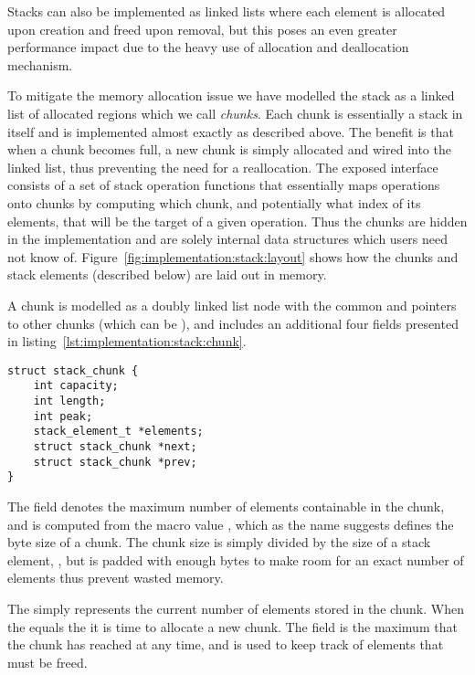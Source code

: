 \begin{remark}
  Stacks can also be implemented as linked lists where each element is
  allocated upon creation and freed upon removal, but this poses an
  even greater performance impact due to the heavy use of allocation
  and deallocation mechanism.
\end{remark}

To mitigate the memory allocation issue we have modelled the stack as
a linked list of allocated regions which we call \textit{chunks}. Each
chunk is essentially a stack in itself and is implemented almost
exactly as described above. The benefit is that when a chunk becomes
full, a new chunk is simply allocated and wired into the linked list,
thus preventing the need for a reallocation. The exposed interface
consists of a set of stack operation functions that essentially maps
operations onto chunks by computing which chunk, and potentially what
index of its elements, that will be the target of a given
operation. Thus the chunks are hidden in the implementation and are
solely internal data structures which users need not know
of. Figure~\ref{fig:implementation:stack:layout} shows how the chunks
and stack elements (described below) are laid out in memory.

A chunk is modelled as a doubly linked list node with the common
 and  pointers to other chunks (which can be
), and includes an additional four fields presented in
listing~\ref{lst:implementation:stack:chunk}.

\begin{lstlisting}[language={[ANSI]C},%
  caption={Structure defining a chunk of the stack},%
  label={lst:implementation:stack:chunk}]
struct stack_chunk {
    int capacity;
    int length;
    int peak;
    stack_element_t *elements;
    struct stack_chunk *next;
    struct stack_chunk *prev;
}
\end{lstlisting}

The  field denotes the maximum number of elements
containable in the chunk, and is computed from the macro value
, which as the name suggests defines the byte
size of a chunk. The chunk size is simply divided by the size of a
stack element, , but is padded with enough
bytes to make room for an exact number of elements thus prevent wasted
memory.

The  simply represents the current number of elements
stored in the chunk. When the  equals the 
it is time to allocate a new chunk. The  field is the
maximum  that the chunk has reached at any time, and is
used to keep track of elements that must be freed.

